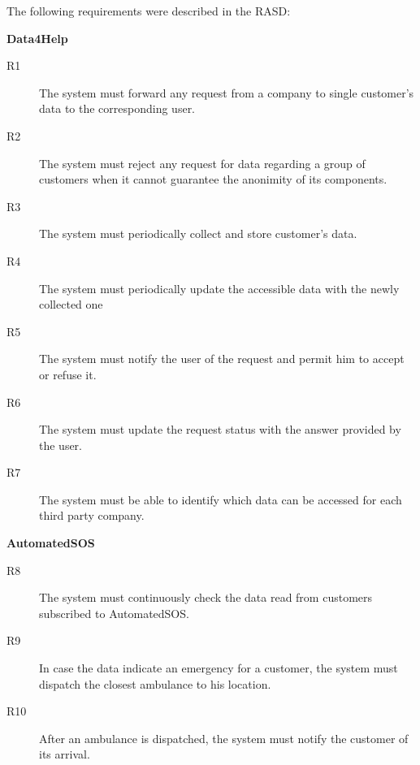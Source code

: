 \documentclass[../main.tex]{subfiles}
\begin{document}
The following requirements were described in the RASD:

\begin{description}

  \item {\bf Data4Help}

  \begin{description}

  	\item [R1] The system must forward any request from a company to single customer's data to the corresponding user.

  	\item [R2] The system must reject any request for data regarding a group of customers when it cannot guarantee the anonimity of its components.

  	\item [R3] The system must periodically collect and store customer's data.

  	\item [R4] The system must periodically update the accessible data with the newly collected one

  	\item [R5] The system must notify the user of the request and permit him to accept or refuse it.

  	\item [R6] The system must update the request status with the answer provided by the user.

  	\item [R7] The system must be able to identify which data can be accessed for each third party company.

  \end{description}

  \item {\bf AutomatedSOS}

  \begin{description}

    \item [R8] The system must continuously check the data read from customers subscribed to AutomatedSOS.

    \item [R9] In case the data indicate an emergency for a customer, the system must dispatch the closest ambulance to his location.

    \item [R10] After an ambulance is dispatched, the system must notify the customer of its arrival.


\end{description}
\end{description}
\end{document}

